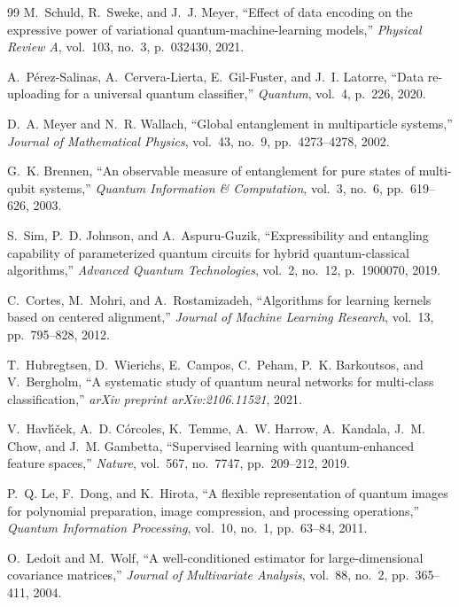 \documentclass[10pt,twocolumn,twoside,a4paper]{article}
\begin{document}
\begin{thebibliography}{99}
M.~Schuld, R.~Sweke, and J.~J. Meyer,
``Effect of data encoding on the expressive power of variational quantum-machine-learning models,''
\textit{Physical Review A}, vol.~103, no.~3, p.~032430, 2021.

A.~P{\'e}rez-Salinas, A.~Cervera-Lierta, E.~Gil-Fuster, and J.~I. Latorre,
``Data re-uploading for a universal quantum classifier,''
\textit{Quantum}, vol.~4, p.~226, 2020.

D.~A. Meyer and N.~R. Wallach,
``Global entanglement in multiparticle systems,''
\textit{Journal of Mathematical Physics}, vol.~43, no.~9, pp.~4273--4278, 2002.

G.~K. Brennen,
``An observable measure of entanglement for pure states of multi-qubit systems,''
\textit{Quantum Information \& Computation}, vol.~3, no.~6, pp.~619--626, 2003.

S.~Sim, P.~D. Johnson, and A.~Aspuru-Guzik,
``Expressibility and entangling capability of parameterized quantum circuits for hybrid quantum-classical algorithms,''
\textit{Advanced Quantum Technologies}, vol.~2, no.~12, p.~1900070, 2019.

C.~Cortes, M.~Mohri, and A.~Rostamizadeh,
``Algorithms for learning kernels based on centered alignment,''
\textit{Journal of Machine Learning Research}, vol.~13, pp.~795--828, 2012.

T.~Hubregtsen, D.~Wierichs, E.~Campos, C.~Peham, P.~K. Barkoutsos, and V.~Bergholm,
``A systematic study of quantum neural networks for multi-class classification,''
\textit{arXiv preprint arXiv:2106.11521}, 2021.

V.~Havl{\'\i}{\v{c}}ek, A.~D. C{\'o}rcoles, K.~Temme, A.~W. Harrow, A.~Kandala, J.~M. Chow, and J.~M. Gambetta,
``Supervised learning with quantum-enhanced feature spaces,''
\textit{Nature}, vol.~567, no.~7747, pp.~209--212, 2019.

P.~Q. Le, F.~Dong, and K.~Hirota,
``A flexible representation of quantum images for polynomial preparation, image compression, and processing operations,''
\textit{Quantum Information Processing}, vol.~10, no.~1, pp.~63--84, 2011.

O.~Ledoit and M.~Wolf,
``A well-conditioned estimator for large-dimensional covariance matrices,''
\textit{Journal of Multivariate Analysis}, vol.~88, no.~2, pp.~365--411, 2004.


\end{thebibliography}
\end{document}
